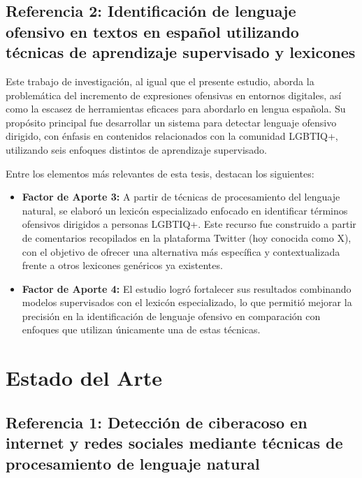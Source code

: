 \subsection{Referencia 2: Identificación de lenguaje ofensivo en textos en español utilizando técnicas de aprendizaje supervisado y lexicones}

Este trabajo de investigación, al igual que el presente estudio, aborda la problemática del incremento de expresiones ofensivas en entornos digitales, así como la escasez de herramientas eficaces para abordarlo en lengua española. Su propósito principal fue desarrollar un sistema para detectar lenguaje ofensivo dirigido, con énfasis en contenidos relacionados con la comunidad LGBTIQ+, utilizando seis enfoques distintos de aprendizaje supervisado.

Entre los elementos más relevantes de esta tesis, destacan los siguientes:

\begin{itemize}
    \item \textbf{Factor de Aporte 3:} A partir de técnicas de procesamiento del lenguaje natural, se elaboró un lexicón especializado enfocado en identificar términos ofensivos dirigidos a personas LGBTIQ+. Este recurso fue construido a partir de comentarios recopilados en la plataforma Twitter (hoy conocida como X), con el objetivo de ofrecer una alternativa más específica y contextualizada frente a otros lexicones genéricos ya existentes.
\end{itemize}










\vspace{0.5cm}

\begin{itemize}
    \item \textbf{Factor de Aporte 4:} El estudio logró fortalecer sus resultados combinando modelos supervisados con el lexicón especializado, lo que permitió mejorar la precisión en la identificación de lenguaje ofensivo en comparación con enfoques que utilizan únicamente una de estas técnicas.
\end{itemize}

\section{Estado del Arte}

\subsection{Referencia 1: Detección de ciberacoso en internet y redes sociales mediante técnicas de procesamiento de lenguaje natural}

